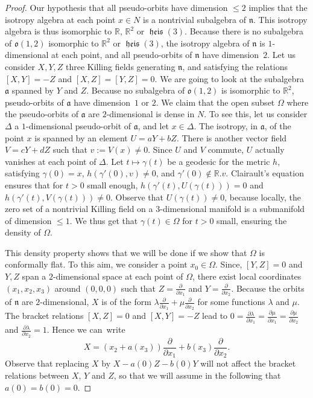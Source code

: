 \documentclass[11pt]{article}
\theoremstyle{definition}
\numberwithin{equation}{section}
\numberwithin{figure}{section}
\numberwithin{table}{section}
\DeclareMathOperator{\heis}{{\mathfrak{heis}}}
\newcommand*\RR{\mathbb{R}}
\newcommand{\lien}{{\mathfrak{n}}}
\newcommand{\liea}{{\mathfrak{a}}}
\newcommand{\oo}{{\mathfrak{o}}}
\newcommand{\delx}{{\frac{\partial}{\partial x_1}}}
\newcommand{\dely}{{\frac{\partial}{\partial x_2}}}
\begin{document}
\begin{proof}
Our hypothesis that all pseudo-orbits have dimension $\leq 2$ implies that the isotropy algebra at each point $x \in N$ is a nontrivial subalgebra of $\lien$. This isotropy algebra is thus isomorphic to $\RR$, $\RR^2$ or $\heis(3)$. Because there is no subalgebra of ${\oo}(1,2)$ isomorphic to $\RR^2$ or ${\heis}(3)$, the isotropy algebra of $\lien$ is $1$-dimensional at each point, and all pseudo-orbits of $\lien$ have dimension~$2$. Let us consider $X,Y,Z$ three Killing fields generating $\lien$, and satisfying the relations $[X,Y]=-Z$ and $[X,Z]=[Y,Z]=0$. We are going to look at the subalgebra ${\mathfrak a}$ spanned by $Y$ and $Z$. Because no subalgebra of ${\oo}(1,2)$ is isomorphic to $\RR^2$, pseudo-orbits of ${\mathfrak a}$ have dimension~$1$ or $2$. We claim that the open subset $\Omega$ where the pseudo-orbits of $\liea$ are $2$-dimensional is dense in $N$. To see this, let us consider $\Delta$ a $1$-dimensional pseudo-orbit of $\liea$, and let $x \in \Delta$. The isotropy, in ${\mathfrak a}$, of the point $x$ is spanned by an element $U=aY+bZ$. There is another vector field $V=cY+dZ$ such that $v:=V(x) \not =0$. Since $U$ and $V$ commute, $U$ actually vanishes at each point of $\Delta$. Let $t \mapsto \gamma(t)$ be a geodesic for the metric $h$, satisfying $\gamma(0)=x$, $h(\gamma'(0),v) \not =0$, and $\gamma'(0) \not \in \RR.v$. Clairault's equation ensures that for $t>0$ small enough, $h(\gamma'(t),U(\gamma(t)))=0$ and $h(\gamma'(t),V(\gamma(t))) \not =0$. Observe that $U(\gamma(t)) \not = 0$, because locally, the zero set of a nontrivial Killing field on a $3$-dimensional manifold is a submanifold of dimension $\leq 1$. We thus get that $\gamma(t) \in \Omega$ for $t>0$ small, ensuring the density of $\Omega$.

This density property shows that we will be done if we show that $\Omega$ is conformally flat. To this aim, we consider a point $x_0 \in \Omega$. Since, $[Y,Z]=0$ and $Y,Z$ span a $2$-dimensional space at each point of $\Omega$, there exist local coordinates $(x_1,x_2,x_3)$ around $(0,0,0)$ such that $Z=\delx$ and $Y=\dely$. Because the orbits of $\lien$ are $2$-dimensional, $X$ is of the form $\lambda \delx + \mu \dely$ for some functions $\lambda$ and $\mu$. The bracket relations $[X,Z]=0$ and $[X,Y]=-Z$ lead to $0=\frac{\partial \lambda}{\partial x_1}=\frac{\partial \mu}{\partial x_1}=\frac{\partial \mu}{\partial x_2}$ and $\frac{\partial \lambda}{\partial x_2}=1$. Hence we can~write
\[
X=(x_2+a(x_3))\delx + b(x_3)\dely.
\]
Observe that replacing $X$ by $X-a(0)Z-b(0)Y$ will not affect the bracket relations between $X$, $Y$ and $Z$, so that we will assume in the following that $a(0)=b(0)=0$.


\end{proof}
\end{document}
